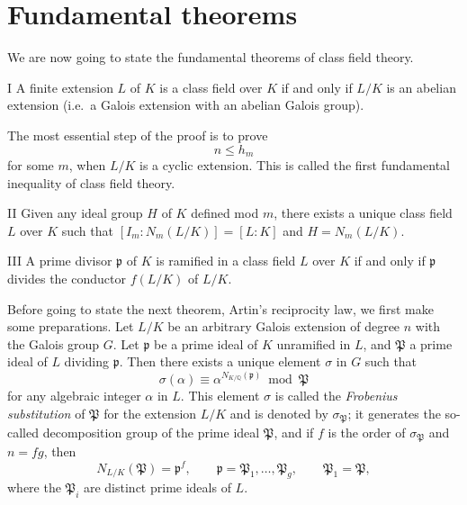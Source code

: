 \section{Fundamental theorems}\label{sec:V-fundamental}

We are now going to state the fundamental theorems of class field theory.

\begin{namedstmt}{I}
A finite extension $L$ of $K$ is a class field over $K$ if and only if
$L/K$ is an abelian extension (i.e.\ a Galois extension with an abelian
Galois group).
\end{namedstmt}

The most essential step of the proof is to prove
\[
n\leq h_{m}
\]
for some $m$, when $L/K$ is a cyclic extension. This is called the first
fundamental inequality of class field theory.

\begin{namedstmt}{II}
Given any ideal group $H$ of $K$ defined mod $m$, there exists a unique
class field $L$ over $K$ such that $[I_{m}:N_{m}(L/K)]=[L:K]$ and
$H=N_{m}(L/K)$.
\end{namedstmt}

\begin{namedstmt}{III}
A prime divisor $\mathfrak{p}$ of $K$ is ramified in a class field $L$
over $K$ if and only if $\mathfrak{p}$ divides the conductor $f(L/K)$ of
$L/K$.
\end{namedstmt}

Before going to state the next theorem, Artin's reciprocity law, we first
make some preparations. Let $L/K$ be an arbitrary Galois extension of
degree $n$ with the Galois group $G$. Let $\mathfrak{p}$ be a prime ideal
of $K$ unramified in $L$, and $\mathfrak{P}$ a prime ideal of $L$
dividing $\mathfrak{p}$. Then there exists a unique element $\sigma$ in
$G$ such that
\[
\sigma(\alpha)\equiv\alpha^{N_{K/\mathbb{Q}}(\mathfrak{p})}
\bmod\mathfrak{P}
\tag{4}\label{eq:V-4}
\]
for any algebraic integer $\alpha$ in $L$. This element $\sigma$ is called
the \emph{Frobenius substitution} of $\mathfrak{P}$ for the extension
$L/K$ and is denoted by $\sigma_{\mathfrak{P}}$; it generates the
so-called decomposition group of the prime ideal $\mathfrak{P}$, and if
$f$ is the order of $\sigma_{\mathfrak{P}}$ and $n=fg$, then
\[
N_{L/K}(\mathfrak{P})=\mathfrak{p}^{f},\qquad
\mathfrak{p}=\mathfrak{P}_{1},\dots,\mathfrak{P}_{g},\qquad
\mathfrak{P}_{1}=\mathfrak{P},
\]
where the $\mathfrak{P}_{i}$ are distinct prime ideals of $L$.

